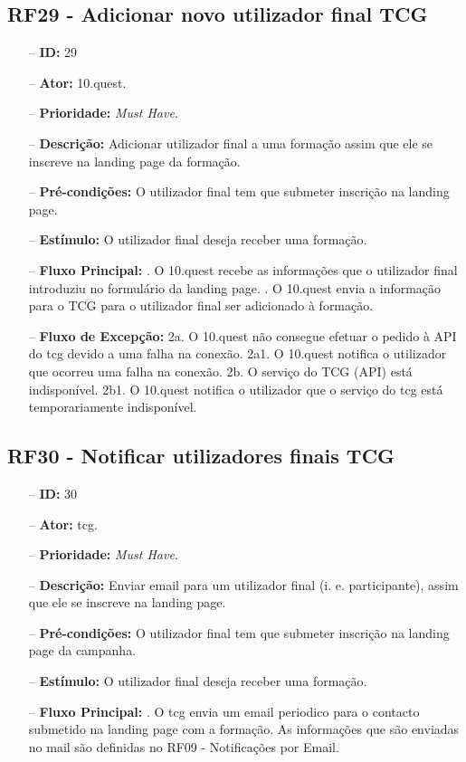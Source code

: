 \subsection{RF29 - Adicionar novo utilizador final TCG}
\begin{itemize}
	\item[--] \textbf{ID:} 29
	\item[--]  \textbf{Ator:} 10.quest.
	\item[--]  \textbf{Prioridade:} \textit{Must Have}.
	\item[--]  \textbf{Descrição:} Adicionar utilizador final a uma formação assim que ele se inscreve na landing page da formação.
	\item[--]  \textbf{Pré-condições:} O utilizador final tem que submeter inscrição na landing page.
	\item[--]  \textbf{Estímulo:} O utilizador final deseja receber uma formação.
	\item[--]  \textbf{Fluxo Principal:} 
	. O 10.quest recebe as informações que o utilizador final introduziu no formulário da landing page.
	. O 10.quest envia a informação para o TCG para o utilizador final ser adicionado à formação.
	\item[--]  \textbf{Fluxo de Excepção:} 
	\subitem 2a. O 10.quest não consegue efetuar o pedido à API do \acrshort{tcg} devido a uma falha na conexão.
	\subitem 2a1. O 10.quest notifica o utilizador que ocorreu uma falha na conexão.
	\subitem 2b. O serviço do TCG (API) está indisponível.
	\subitem 2b1. O 10.quest notifica o utilizador que o serviço do \acrshort{tcg} está temporariamente indisponível. 
\end{itemize}
\newpage

\subsection{RF30 - Notificar utilizadores finais TCG}
\begin{itemize}
	\item[--] \textbf{ID:} 30
	\item[--]  \textbf{Ator:} \acrfull{tcg}.
	\item[--]  \textbf{Prioridade:} \textit{Must Have}.
	\item[--]  \textbf{Descrição:} Enviar email para um utilizador final (i. e. participante), assim que ele se inscreve na landing page.
	\item[--]  \textbf{Pré-condições:} O utilizador final tem que submeter inscrição na landing page da campanha.
	\item[--]  \textbf{Estímulo:} O utilizador final deseja receber uma formação.
	\item[--]  \textbf{Fluxo Principal:} 
	. O \acrshort{tcg} envia um email periodico para o contacto submetido na landing page com a formação. As informações que são enviadas no mail são definidas no RF09 - Notificações por Email.
\end{itemize}
\newpage

